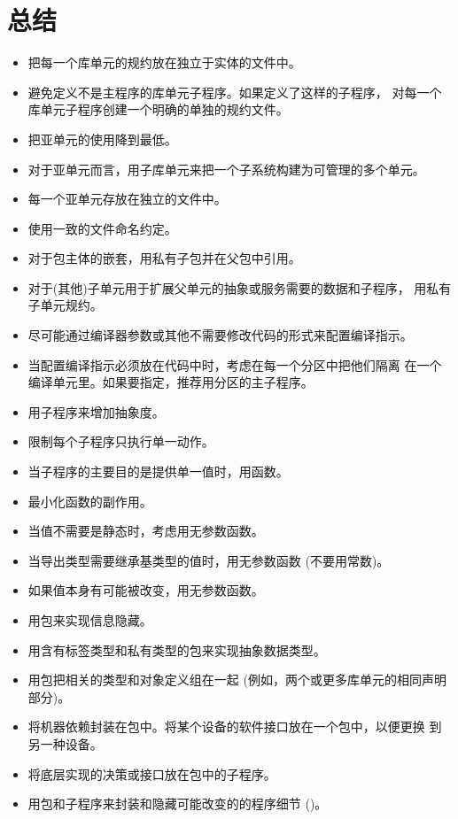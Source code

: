 %
%
%

\section{总结}
\begin{itemize}
\item 把每一个库单元的规约放在独立于实体的文件中。
\item 避免定义不是主程序的库单元子程序。如果定义了这样的子程序，
对每一个库单元子程序创建一个明确的单独的规约文件。
\item 把亚单元的使用降到最低。
\item 对于亚单元而言，用子库单元来把一个子系统构建为可管理的多个单元。
\item 每一个亚单元存放在独立的文件中。
\item 使用一致的文件命名约定。
\item 对于包主体的嵌套，用私有子包并在父包中引用。
\item 对于(其他)子单元用于扩展父单元的抽象或服务需要的数据和子程序，
 用私有子单元规约。

\item 尽可能通过编译器参数或其他不需要修改代码的形式来配置编译指示。
\item 当配置编译指示必须放在代码中时，考虑在每一个分区中把他们隔离
在一个编译单元里。如果要指定，推荐用分区的主子程序。

\item 用子程序来增加抽象度。
\item 限制每个子程序只执行单一动作。

\item 当子程序的主要目的是提供单一值时，用函数。
\item 最小化函数的副作用。
\item 当值不需要是静态时，考虑用无参数函数。
\item 当导出类型需要继承基类型的值时，用无参数函数 (不要用常数)。
\item 如果值本身有可能被改变，用无参数函数。

\item 用包来实现信息隐藏。
\item 用含有标签类型和私有类型的包来实现抽象数据类型。
\item 用包把相关的类型和对象定义组在一起
      (例如，两个或更多库单元的相同声明部分)。
\item 将机器依赖封装在包中。将某个设备的软件接口放在一个包中，以便更换
到另一种设备。
\item 将底层实现的决策或接口放在包中的子程序。
\item 用包和子程序来封装和隐藏可能改变的的程序细节 (\cite{nissen84})。


\end{itemize}
